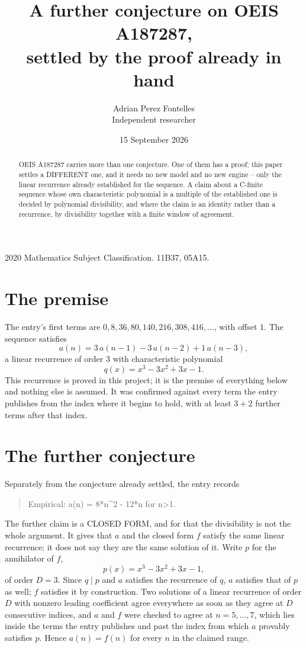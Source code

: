 \documentclass[11pt,a4paper]{article}
\title{A further conjecture on OEIS A187287,\\ \large settled by the proof already in hand}
\author{Adrian Perez Fontelles\\ \small Independent researcher}
\date{15 September 2026}
\theoremstyle{plain}
\theoremstyle{definition}
\begin{document}
\maketitle

\begin{abstract}
OEIS A187287 carries more than one conjecture. One of them has a proof; this paper settles a
DIFFERENT one, and it needs no new model and no new engine -- only the linear recurrence already
established for the sequence. A claim about a C-finite sequence whose own characteristic
polynomial is a multiple of the established one is decided by polynomial divisibility, and where
the claim is an identity rather than a recurrence, by divisibility together with a finite window
of agreement.
\end{abstract}

\noindent\small 2020 Mathematics Subject Classification. 11B37, 05A15.\normalsize

\section{The premise}

The entry's first terms are $0, 8, 36, 80, 140, 216, 308, 416,\dots$, with offset $1$. The sequence satisfies
\[
  a(n)=3\,a(n-1) - 3\,a(n-2) + 1\,a(n-3) ,
\]
a linear recurrence of order $3$ with characteristic polynomial
\[
  q(x)=x^{3} - 3 x^{2} + 3 x - 1 .
\]
This recurrence is proved in this project; it is the premise of everything below and nothing else is assumed.
It was confirmed against every term the entry publishes from the index where it begins to hold,
with at least $3+2$ further terms after that index.

\section{The further conjecture}

Separately from the conjecture already settled, the entry records

\begin{quote}\raggedright Empirical: a(n) = 8*n\^{}2 - 12*n for n>1.\end{quote}

The further claim is a CLOSED FORM, and for that the divisibility is not the whole argument. It
gives that $a$ and the closed form $f$ satisfy the same linear recurrence; it does not say they
are the same solution of it. Write $p$ for the annihilator of $f$,
\[
  p(x)=x^{3} - 3 x^{2} + 3 x - 1 ,
\]
of order $D=3$. Since $q\mid p$ and $a$ satisfies the recurrence of $q$, $a$ satisfies that of
$p$ as well; $f$ satisfies it by construction. Two solutions of a linear recurrence of order $D$
with nonzero leading coefficient agree everywhere as soon as they agree at $D$ consecutive
indices, and $a$ and $f$ were checked to agree at $n=5,\dots,7$,
which lies inside the terms the entry publishes and past the index from which $a$ provably
satisfies $p$. Hence $a(n)=f(n)$ for every $n$ in the claimed range.
\end{document}
